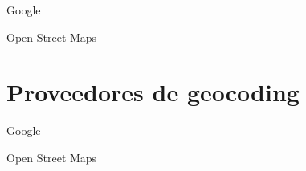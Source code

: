 \begin{definitionlist}
  \item[Google]

  \item[Open Street Maps]
 
\end{definitionlist}


\section{Proveedores de geocoding}


\begin{definitionlist}
  \item[Google]

  \item[Open Street Maps]
 
\end{definitionlist}

